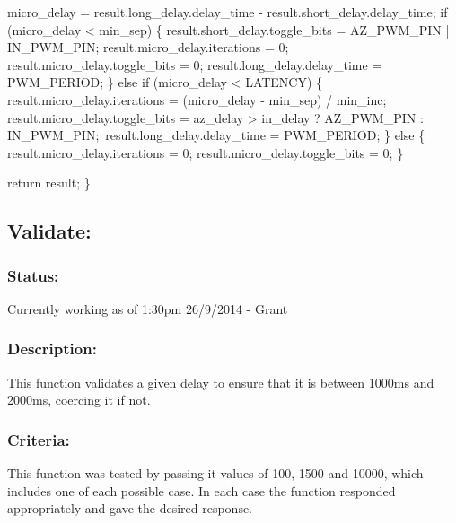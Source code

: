 \documentclass[]{article}
\begin{document}
	micro\_delay = result.long\_delay.delay\_time - result.short\_delay.delay\_time;\newline
	if (micro\_delay < min\_sep)\newline
	\{\newline
		result.short\_delay.toggle\_bits = AZ\_PWM\_PIN | IN\_PWM\_PIN;\newline
		result.micro\_delay.iterations = 0;\newline
		result.micro\_delay.toggle\_bits = 0;\newline
		result.long\_delay.delay\_time = PWM\_PERIOD;\newline
	\}\newline
	else if (micro\_delay < LATENCY)\newline
	\{\newline
		result.micro\_delay.iterations = (micro\_delay - min\_sep) / min\_inc;\newline
		result.micro\_delay.toggle\_bits = az\_delay > in\_delay ? AZ\_PWM\_PIN : IN\_PWM\_PIN;\newline\
		result.long\_delay.delay\_time = PWM\_PERIOD;\newline
	\}\newline
	else\newline
	\{\newline
		result.micro\_delay.iterations = 0;\newline
		result.micro\_delay.toggle\_bits = 0;\newline
	\}\newline
	
	return result;\newline
\}\newline

\subsection{Validate:}
\subsubsection{Status:}
Currently working as of 1:30pm 26/9/2014 - Grant

\subsubsection{Description:}
This function validates a given delay to ensure that it is between 1000ms and 2000ms, coercing it if not.

\subsubsection{Criteria:}
This function was tested by passing it values of 100, 1500 and 10000, which includes one of each possible case. In each case the function responded appropriately and gave the desired response.
\end{document}
